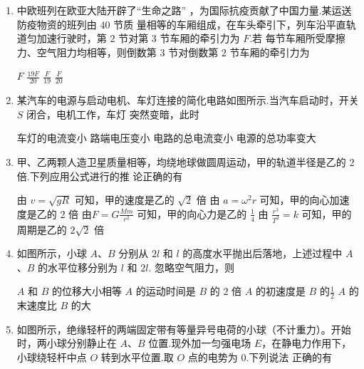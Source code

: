 \begin{enumerate}
\item
中欧班列在欧亚大陆开辟了“生命之路”
，为国际抗疫贡献了中国力量.某运送防疫物资的班列由 $ 40 $ 节质
量相等的车厢组成，在车头牵引下，列车沿平直轨道匀加速行驶时，第 $ 2 $ 节对第 $ 3 $ 节车厢的牵引力为 $ F $.若
每节车厢所受摩擦力、空气阻力均相等，则倒数第 $ 3 $ 节对倒数第 $ 2 $ 节车厢的牵引力为  

\fourchoices
{$F$}
{$\frac{19 F}{20}$}
{$\frac{F}{19}$}
{$\frac{F}{20}$}






\item
某汽车的电源与启动电机、车灯连接的简化电路如图所示.当汽车启动时，开关 $ S $ 闭合，电机工作，车灯
突然变暗，此时 
\begin{figure}[h!]
\centering

\end{figure}


\fourchoices
{车灯的电流变小}
{路端电压变小}
{电路的总电流变小}
{电源的总功率变大}





\item
甲、乙两颗人造卫星质量相等，均绕地球做圆周运动，甲的轨道半径是乙的 $ 2 $ 倍.下列应用公式进行的推
论正确的有  

\fourchoices
{由 $v=\sqrt{g R}$ 可知，甲的速度是乙的 $\sqrt{2}$ 倍}
{由 $a=\omega^{2} r$ 可知，甲的向心加速度是乙的 2 倍}
{由$ F=G \frac{M m}{r^{2}}$ 可知，甲的向心力是乙的 $\frac{1}{4}$}
{由 $\frac{r^{3}}{T^{2}}=k$ 可知，甲的周期是乙的 $2 \sqrt{2}$ 倍}






\item 
如图所示，小球 $ A $、$ B $ 分别从 $ 2l $ 和 $ l $ 的高度水平抛出后落地，上述过程中 $ A $、$ B $ 的水平位移分别为 $ l $ 和 $ 2l $.
忽略空气阻力，则  
\begin{figure}[h!]
\centering

\end{figure}


\fourchoices
{$ A $ 和 $ B $ 的位移大小相等}
{$ A $ 的运动时间是 $ B $ 的 $ 2 $ 倍}
{$ A $ 的初速度是 $ B $ 的$ \frac{ 1 }{ 2 } $}
{$ A $ 的末速度比 $ B $ 的大}





\item
如图所示，绝缘轻杆的两端固定带有等量异号电荷的小球（不计重力）。开始时，两小球分别静止在 $ A $、$ B $
位置.现外加一匀强电场 $ E $，在静电力作用下，小球绕轻杆中点 $ O $ 转到水平位置.取 $ O $ 点的电势为 $ 0 $.下列说法
正确的有  
\begin{figure}[h!]
\centering

\end{figure}



\end{enumerate}
